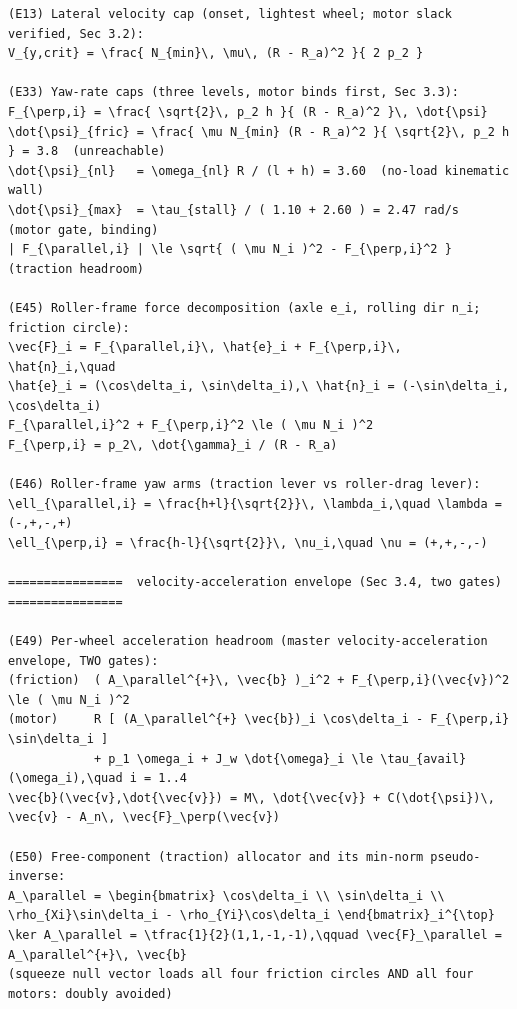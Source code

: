\documentclass[11pt]{article}
\begin{document}
\begin{lstlisting}
(E13) Lateral velocity cap (onset, lightest wheel; motor slack verified, Sec 3.2):
V_{y,crit} = \frac{ N_{min}\, \mu\, (R - R_a)^2 }{ 2 p_2 }

(E33) Yaw-rate caps (three levels, motor binds first, Sec 3.3):
F_{\perp,i} = \frac{ \sqrt{2}\, p_2 h }{ (R - R_a)^2 }\, \dot{\psi}
\dot{\psi}_{fric} = \frac{ \mu N_{min} (R - R_a)^2 }{ \sqrt{2}\, p_2 h } = 3.8  (unreachable)
\dot{\psi}_{nl}   = \omega_{nl} R / (l + h) = 3.60  (no-load kinematic wall)
\dot{\psi}_{max}  = \tau_{stall} / ( 1.10 + 2.60 ) = 2.47 rad/s  (motor gate, binding)
| F_{\parallel,i} | \le \sqrt{ ( \mu N_i )^2 - F_{\perp,i}^2 }   (traction headroom)

(E45) Roller-frame force decomposition (axle e_i, rolling dir n_i; friction circle):
\vec{F}_i = F_{\parallel,i}\, \hat{e}_i + F_{\perp,i}\, \hat{n}_i,\quad
\hat{e}_i = (\cos\delta_i, \sin\delta_i),\ \hat{n}_i = (-\sin\delta_i, \cos\delta_i)
F_{\parallel,i}^2 + F_{\perp,i}^2 \le ( \mu N_i )^2
F_{\perp,i} = p_2\, \dot{\gamma}_i / (R - R_a)

(E46) Roller-frame yaw arms (traction lever vs roller-drag lever):
\ell_{\parallel,i} = \frac{h+l}{\sqrt{2}}\, \lambda_i,\quad \lambda = (-,+,-,+)
\ell_{\perp,i} = \frac{h-l}{\sqrt{2}}\, \nu_i,\quad \nu = (+,+,-,-)

================  velocity-acceleration envelope (Sec 3.4, two gates)  ================

(E49) Per-wheel acceleration headroom (master velocity-acceleration envelope, TWO gates):
(friction)  ( A_\parallel^{+}\, \vec{b} )_i^2 + F_{\perp,i}(\vec{v})^2 \le ( \mu N_i )^2
(motor)     R [ (A_\parallel^{+} \vec{b})_i \cos\delta_i - F_{\perp,i} \sin\delta_i ]
            + p_1 \omega_i + J_w \dot{\omega}_i \le \tau_{avail}(\omega_i),\quad i = 1..4
\vec{b}(\vec{v},\dot{\vec{v}}) = M\, \dot{\vec{v}} + C(\dot{\psi})\, \vec{v} - A_n\, \vec{F}_\perp(\vec{v})

(E50) Free-component (traction) allocator and its min-norm pseudo-inverse:
A_\parallel = \begin{bmatrix} \cos\delta_i \\ \sin\delta_i \\ \rho_{Xi}\sin\delta_i - \rho_{Yi}\cos\delta_i \end{bmatrix}_i^{\top}
\ker A_\parallel = \tfrac{1}{2}(1,1,-1,-1),\qquad \vec{F}_\parallel = A_\parallel^{+}\, \vec{b}
(squeeze null vector loads all four friction circles AND all four motors: doubly avoided)


\end{lstlisting}
\end{document}
